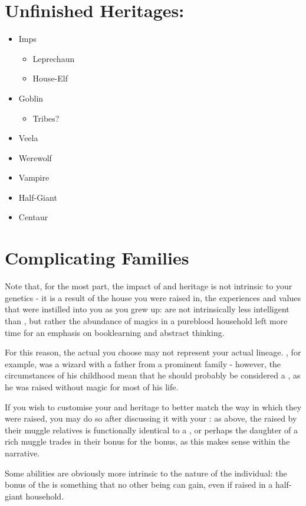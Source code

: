 \section{Unfinished Heritages:}

\begin{itemize}

	\item Imps
	\begin{itemize}
		\item Leprechaun
		\item House-Elf
	\end{itemize}
	\item Goblin
	\begin{itemize}
		\item Tribes?
	\end{itemize}
	\item Veela
	\item Werewolf
	\item Vampire
	\item Half-Giant
	\item Centaur
\end{itemize}

\section{Complicating Families}

Note that, for the most part, the impact of  and heritage is not intrinsic to your genetics - it is a result of the house you were raised in, the experiences and values that were instilled into you as you grew up:  are not intrinsically less intelligent than , but rather the abundance of magics in a pureblood household left more time for an emphasis on booklearning and abstract thinking. 

For this reason, the actual  you choose may not represent your actual lineage. , for example, was a  wizard with a father from a prominent  family - however, the circumstances of his childhood mean that he should probably be considered a , as he was raised without magic for most of his life.  
 
 If you wish to customise your  and heritage to better match the way in which they were raised, you may do so after discussing it with your : as above, the  raised by their muggle relatives is functionally identical to a , or perhaps the  daughter of a rich muggle trades in their  bonus for the  bonus, as this makes sense within the narrative. 
 
 Some abilities are obviously more intrinsic to the nature of the individual: the  bonus of the  is something that no other being can gain, even if raised in a half-giant household. 
